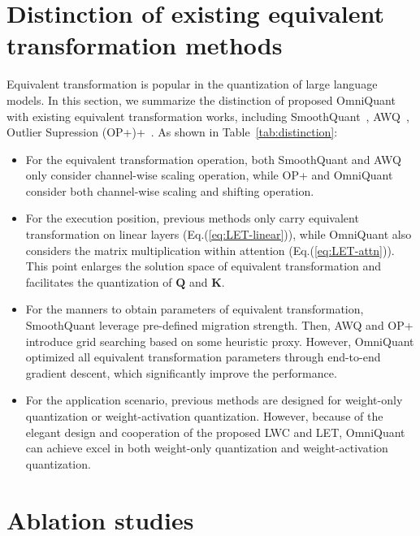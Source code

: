 \documentclass{article} %
\begin{document}
\section{Distinction of existing equivalent transformation methods}\label{sec:distinctions}
Equivalent transformation is popular in the quantization of large language models. In this section, we summarize the distinction of proposed OmniQuant with existing equivalent transformation works, including SmoothQuant~\citep{smoothquant}, AWQ~\cite{awq}, Outlier Supression (OP+)+~\cite{outlier-plus}. As shown in Table~\ref{tab:distinction}:
\begin{itemize}
    \item For the equivalent transformation operation, both SmoothQuant and AWQ only consider channel-wise scaling operation, while OP+ and OmniQuant consider both channel-wise scaling and shifting operation.
    \item For the execution position, previous methods only carry equivalent transformation on linear layers (Eq.(\ref{eq:LET-linear})), while OmniQuant also considers the matrix multiplication within attention  (Eq.(\ref{eq:LET-attn})). This point enlarges the solution space of equivalent transformation and facilitates the quantization of $\mathbf{Q}$ and $\mathbf{K}$.
    \item For the manners to obtain parameters of equivalent transformation, SmoothQuant leverage pre-defined migration strength. Then, AWQ and OP+ introduce grid searching based on some heuristic proxy. However, OmniQuant optimized all equivalent transformation parameters through end-to-end gradient descent, which significantly improve the performance.
    \item For the application scenario, previous methods are designed for weight-only quantization or weight-activation quantization. However, because of the elegant design and cooperation of the proposed LWC and LET, OmniQuant can achieve excel in both weight-only quantization and weight-activation quantization.
\end{itemize}
\color{black}


\section{Ablation studies}\label{sec:ablation-studies}
\end{document}
